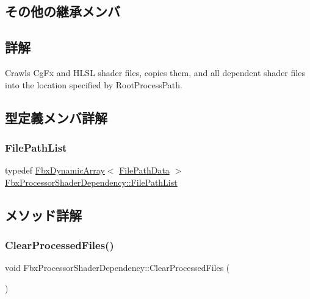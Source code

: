 \subsection*{その他の継承メンバ}


\subsection{詳解}
Crawls Cg\+Fx and H\+L\+SL shader files, copies them, and all dependent shader files into the location specified by Root\+Process\+Path. 

\subsection{型定義メンバ詳解}
\mbox{\label{class_fbx_processor_shader_dependency_a52e467804857e767f194d73000b08f39}} 
\subsubsection{\texorpdfstring{File\+Path\+List}{FilePathList}}
{\footnotesize\ttfamily typedef \hyperlink{class_fbx_dynamic_array}{Fbx\+Dynamic\+Array}$<$ \hyperlink{struct_fbx_processor_shader_dependency_1_1_file_path_data}{File\+Path\+Data} $>$ \hyperlink{class_fbx_processor_shader_dependency_a52e467804857e767f194d73000b08f39}{Fbx\+Processor\+Shader\+Dependency\+::\+File\+Path\+List}\hspace{0.3cm}{\ttfamily [protected]}}



\subsection{メソッド詳解}
\mbox{\label{class_fbx_processor_shader_dependency_a3c93c344271aa09caf870e35597a7b6a}} 
\subsubsection{\texorpdfstring{Clear\+Processed\+Files()}{ClearProcessedFiles()}}
{\footnotesize\ttfamily void Fbx\+Processor\+Shader\+Dependency\+::\+Clear\+Processed\+Files (\begin{DoxyParamCaption}{ }\end{DoxyParamCaption})}

